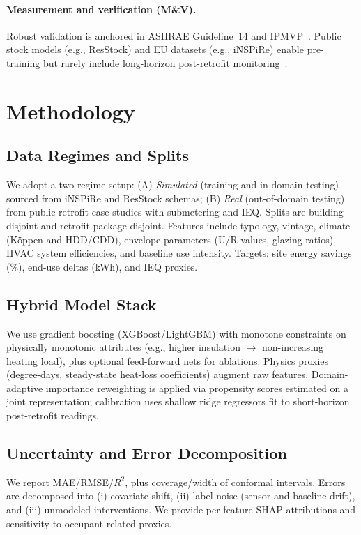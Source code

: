 ﻿\documentclass{article}
\begin{document}
\paragraph{Measurement and verification (M\&V).} Robust validation is anchored in ASHRAE Guideline~14 and IPMVP~\citep{ashrae2014guideline,ipmvp2012}. Public stock models (e.g., ResStock) and EU datasets (e.g., iNSPiRe) enable pre-training but rarely include long-horizon post-retrofit monitoring~\citep{resstock2017,wolf2014inspire}.

\section{Methodology}
\subsection{Data Regimes and Splits}
We adopt a two-regime setup: (A) \emph{Simulated} (training and in-domain testing) sourced from iNSPiRe and ResStock schemas; (B) \emph{Real} (out-of-domain testing) from public retrofit case studies with submetering and IEQ. Splits are building-disjoint and retrofit-package disjoint. Features include typology, vintage, climate (K\"oppen and HDD/CDD), envelope parameters (U/R-values, glazing ratios), HVAC system efficiencies, and baseline use intensity. Targets: site energy savings (\%), end-use deltas (kWh), and IEQ proxies.
\subsection{Hybrid Model Stack}
We use gradient boosting (XGBoost/LightGBM) with monotone constraints on physically monotonic attributes (e.g., higher insulation $\rightarrow$ non-increasing heating load), plus optional feed-forward nets for ablations. Physics proxies (degree-days, steady-state heat-loss coefficients) augment raw features. Domain-adaptive importance reweighting is applied via propensity scores estimated on a joint representation; calibration uses shallow ridge regressors fit to short-horizon post-retrofit readings.
\subsection{Uncertainty and Error Decomposition}
We report MAE/RMSE/$R^2$, plus coverage/width of conformal intervals. Errors are decomposed into (i) covariate shift, (ii) label noise (sensor and baseline drift), and (iii) unmodeled interventions. We provide per-feature SHAP attributions and sensitivity to occupant-related proxies.
\end{document}
